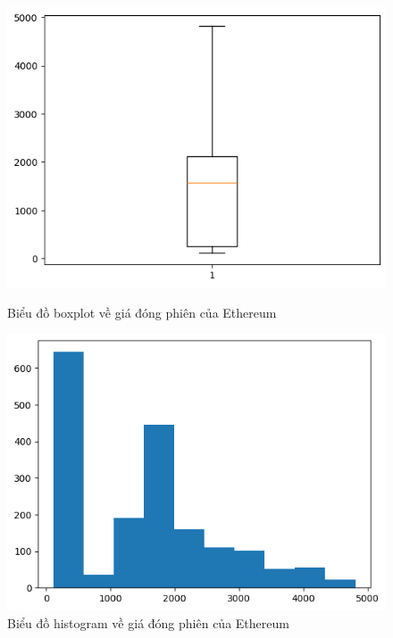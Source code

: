 \documentclass{ieeeojies}
\begin{document}
\begin{figure}[H]
    \centering
    \begin{minipage}{0.23\textwidth}
    \centering
    \includegraphics[width=1\textwidth]{bibliography/pictures/ETHboxplot.png}
    \caption{Biểu đồ boxplot về giá đóng phiên của Ethereum}
    \label{fig:1}
    \end{minipage}
    \hfill
    \begin{minipage}{0.23\textwidth}
    \centering
    \includegraphics[width=1\textwidth]{bibliography/pictures/ETHhistogram.png}
    \caption{Biểu đồ histogram về giá đóng phiên của Ethereum}
    \label{fig:2}
    \end{minipage}
\end{figure}
\end{document}
